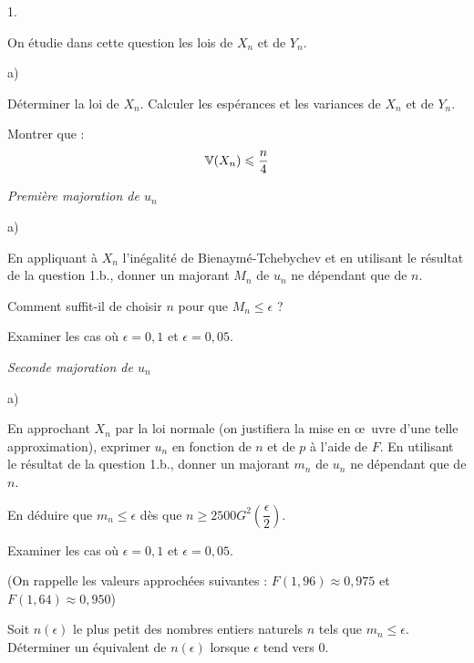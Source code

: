 \documentclass[11pt]{article}%
\begin{document}
\begin{noliste}{1.}
 \setlength{\itemsep}{4mm}
\item On étudie dans cette question les lois de $X_{n}$ et de $Y_{n}$.

\begin{noliste}{a)}
 \setlength{\itemsep}{2mm}
\item Déterminer la loi de $X_{n}$. Calculer les espérances et les
variances de $X_{n}$ et de $Y_{n}$.

\item Montrer que : 
\[
\mathbb{V}(X_{n} )\leqslant \dfrac{n}{4}
\]
\end{noliste}

\item \textit{Première majoration de $u_{n}$}

\begin{noliste}{a)}
 \setlength{\itemsep}{2mm}
\item En appliquant à $X_{n}$ l'inégalité de Bienaymé-Tchebychev et en
utilisant le résultat de la question 1.b., donner un majorant $M_{n}$
de $u_{n} $ ne dépendant que de $n$.

\item Comment suffit-il de choisir $n$ pour que $M_{n} \leq \epsilon$ ?

\hspace{-\leftmargin}Examiner les cas où $\epsilon = 0,1$ et $\epsilon
= 
0,05$.
\end{noliste}

\item \textit{Seconde majoration de $u_{n}$}

\begin{noliste}{a)}
 \setlength{\itemsep}{2mm}
\item En approchant $X_{n}$ par la loi normale (on justifiera la mise
en \oe\ uvre d'une telle approximation), exprimer $u_{n}$ en fonction
de $n$ et de $p$
à l'aide de $F$. En utilisant le résultat de la question 1.b., donner
un
majorant $m_{n}$ de $u_{n}$ ne dépendant que de $n$.

\item En déduire que $m_{n} \leq \epsilon$ dès que $n \geq 2500
G^{2}\left(\dfrac{\epsilon}{2}\right)$.

Examiner les cas où $\epsilon = 0,1$ et $\epsilon = 0,05$.

(On rappelle les valeurs approchées suivantes : $F(1,96) \approx 0,975$
et 
$F(1,64) \approx 0,950$)

\item Soit $n(\epsilon )$ le plus petit des nombres entiers naturels
$n$
tels que $m_{n}\leq \epsilon $. Déterminer un équivalent de $n(\epsilon
)$ lorsque $\epsilon $ tend vers $0$.
\end{noliste}
\end{noliste}

\label{fin}
\end{document}

